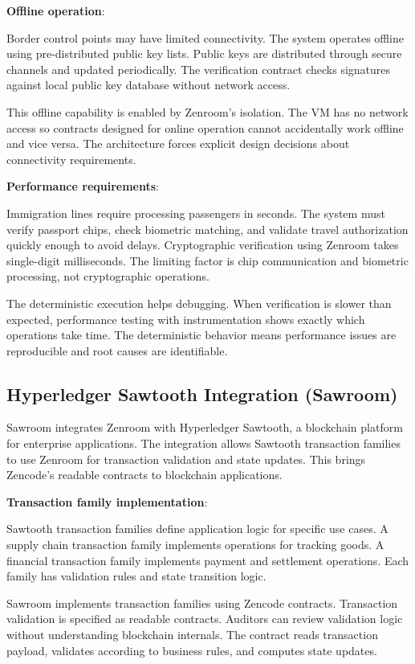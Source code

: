 \textbf{Offline operation}:

Border control points may have limited connectivity. The system
operates offline using pre-distributed public key lists. Public keys
are distributed through secure channels and updated periodically. The
verification contract checks signatures against local public key
database without network access.

This offline capability is enabled by Zenroom's isolation. The VM has
no network access so contracts designed for online operation cannot
accidentally work offline and vice versa. The architecture forces
explicit design decisions about connectivity requirements.

\textbf{Performance requirements}:

Immigration lines require processing passengers in seconds. The system
must verify passport chips, check biometric matching, and validate
travel authorization quickly enough to avoid delays. Cryptographic
verification using Zenroom takes single-digit milliseconds. The
limiting factor is chip communication and biometric processing, not
cryptographic operations.

The deterministic execution helps debugging. When verification is
slower than expected, performance testing with instrumentation shows
exactly which operations take time. The deterministic behavior means
performance issues are reproducible and root causes are identifiable.

\subsection{Hyperledger Sawtooth Integration (Sawroom)}

Sawroom integrates Zenroom with Hyperledger Sawtooth, a blockchain
platform for enterprise applications. The integration allows Sawtooth
transaction families to use Zenroom for transaction validation and
state updates. This brings Zencode's readable contracts to blockchain
applications.

\textbf{Transaction family implementation}:

Sawtooth transaction families define application logic for specific
use cases. A supply chain transaction family implements operations for
tracking goods. A financial transaction family implements payment and
settlement operations. Each family has validation rules and state
transition logic.

Sawroom implements transaction families using Zencode
contracts. Transaction validation is specified as readable
contracts. Auditors can review validation logic without understanding
blockchain internals. The contract reads transaction payload,
validates according to business rules, and computes state updates.

